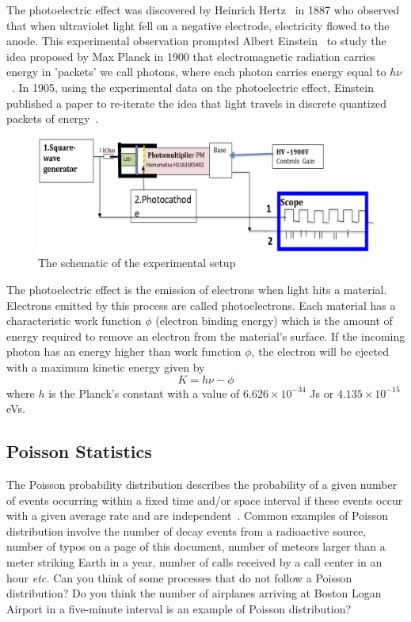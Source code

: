 \documentclass[10pt,aps,twocolumn,secnumarabic,balancelastpage,amsmath,amssymb,nofootinbib,floatfix]{revtex4}
\begin{document}
The photoelectric effect was discovered by Heinrich Hertz~\cite{buchwald1994} in 1887 who observed that when ultraviolet light fell on a negative electrode, electricity flowed to the anode. This experimental observation prompted Albert Einstein~\cite{einstein1905} to study the idea proposed by Max Planck in 1900 that electromagnetic radiation carries energy in 'packets' we call photons, where each photon carries energy equal to $h\nu$~\cite{planck1900}. In 1905, using the experimental data on the photoelectric effect, Einstein published a paper to re-iterate the idea that light travels in discrete quantized packets of energy~\cite{einstein1905}. 

\begin{figure}
  \centering
  \includegraphics[width=1.0\linewidth]{figs/apparatus1.png}
  \caption{The schematic of the experimental setup}
  \label{fig:apparatus1}
\end{figure}

The photoelectric effect is the emission of electrons when light hits a material. Electrons emitted by this process are called photoelectrons. Each material has a characteristic work function $\phi$ (electron binding energy) which is the amount of energy required to remove an electron from the material's surface. If the incoming photon has an energy higher than work function $\phi$, the electron will be ejected with a maximum kinetic energy given by
\begin{equation}
  K = h\nu - \phi
\end{equation}
where $h$ is the Planck's constant with a value of $6.626\times10^{-34}$ Js or $4.135\times10^{-15}$ eVs. %

\subsection{Poisson Statistics}

The Poisson probability distribution describes the probability of a given number of events occurring within a fixed time and/or space interval if these events occur with a given average rate and are independent~\cite{WP-poisson-distribution}. Common examples of Poisson distribution involve the number of decay events from a radioactive source, number of typos on a page of this document, number of meteors larger than a meter striking Earth in a year, number of calls received by a call center in an hour {\it etc.} Can you think of some processes that do not follow a Poisson distribution? Do you think the number of airplanes arriving at Boston Logan Airport in a five-minute interval is an example of Poisson distribution? 
\end{document}
